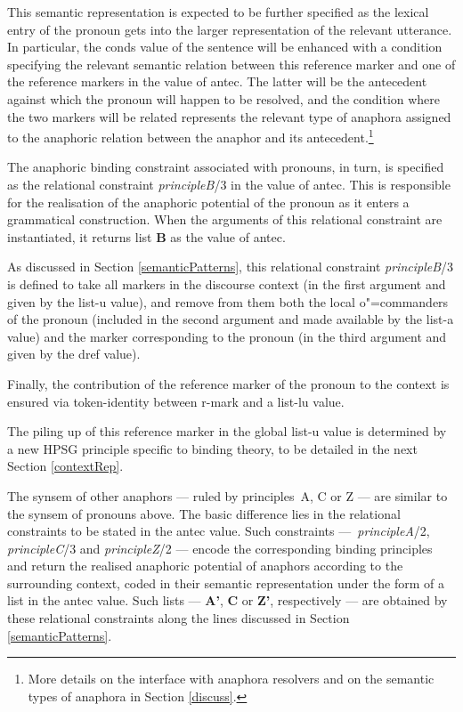 \documentclass[output=paper
,modfonts
,nonflat]{langsci/langscibook}
\begin{document}
This semantic representation is expected
to be further specified as the lexical entry of the
pronoun gets into the larger representation of the
relevant utterance. In particular, the {\sc conds} value of the sentence
will be enhanced with a condition specifying the
relevant semantic relation between this reference marker
and one of the reference markers in the value
of {\sc antec}. The latter will be the antecedent against
which the pronoun will happen to be resolved, and the
condition where the two markers will be related represents the
relevant type of anaphora assigned to the anaphoric relation
between the anaphor and its antecedent.\footnote{
More details on the interface with anaphora resolvers and on the semantic types of anaphora in Section \ref{discuss}.}


The anaphoric binding constraint associated with pronouns, in turn,
is specified as the relational constraint \textit {principleB}/3
in the value of {\sc antec}.  
This is responsible for the realisation of
the anaphoric potential of the pronoun as it enters a grammatical
construction. When the arguments of this relational constraint are instantiated,
it returns list \textbf{B} as the value of {\sc antec}. 

As discussed in Section \ref{semanticPatterns}, this relational constraint \textit {principleB}/3 
is defined to take 
all markers in the discourse context (in the first argument and given 
by the {\sc list-u} value), and remove from them both the local \mbox{o"=commanders}  
of the pronoun (included in the second argument and made available by the {\sc list-a}
value)  and the marker corresponding to the pronoun (in the third  argument and
given by the {\sc dref} value).

Finally, the contribution of the reference marker of the pronoun
to the context is ensured via token-identity
between {\sc r-mark} and a {\sc list-lu} value.

The piling up of this reference
marker in the global {\sc list-u} value is determined
by a new HPSG principle specific to binding theory, to be detailed in the next Section \ref{contextRep}.

The {\sc synsem} of other anaphors --- ruled by principles~A, C or Z --- are 
similar to the {\sc synsem} of pronouns above. The basic difference lies in the
relational constraints to be stated in the {\sc antec} value. Such constraints  
---~{\it principleA}/2, {\it principleC}/3 and {\it principleZ}/2 --- encode the 
corresponding binding principles and return the realised
anaphoric potential of anaphors according to the surrounding context,
coded in their semantic representation under the form
of a list in the {\sc antec} value. Such 
lists --- \textbf{A'}, \textbf{C} or \textbf{Z'}, respectively --- are obtained 
by these relational constraints along the lines
discussed in Section \ref{semanticPatterns}.
\end{document}
